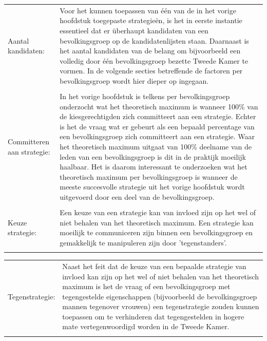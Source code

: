 \noindent\begin{tabularx}{\textwidth}{LI}
Aantal kandidaten: &  Voor het kunnen toepassen van één van de in het vorige hoofdstuk toegepaste strategie\"{e}n, is het in eerste instantie essentieel dat er \"{u}berhaupt kandidaten van een bevolkingsgroep op de kandidatenlijsten staan. Daarnaast is het aantal kandidaten van de belang om bijvoorbeeld een volledig door één bevolkingsgroep bezette Tweede Kamer te vormen. In de volgende secties betreffende de factoren per bevolkingsgroep wordt hier dieper op ingegaan. \\
\\  
Committeren aan strategie:  & In het vorige hoofdstuk is telkens per bevolkingsgroep onderzocht wat het theoretisch maximum is wanneer 100\% van de kiesgerechtigden zich committeert aan een strategie. Echter is het de vraag wat er gebeurt als een bepaald percentage van een bevolkingsgroep zich committeert aan een strategie. Waar het theoretisch maximum uitgaat van 100\% deelname van de leden van een bevolkingsgroep is dit in de praktijk moeilijk haalbaar. Het is daarom interessant te onderzoeken wat het theoretisch maximum per bevolkingsgroep is wanneer de meeste succesvolle strategie uit het vorige hoofdstuk wordt uitgevoerd door een deel van de bevolkingsgroep.  \\
\\
Keuze strategie: &  Een keuze van een strategie kan van invloed zijn op het wel of niet behalen van het theoretisch maximum. Een strategie kan moeilijk te communiceren zijn binnen een bevolkingsgroep en gemakkelijk te manipuleren zijn door 'tegenstanders'.\\
\\
\end{tabularx}  
 
\noindent\begin{tabularx}{\textwidth}{LI}

Tegenstrategie: & Naast het feit dat de keuze van een bepaalde strategie van invloed kan zijn op het wel of niet behalen van het theoretisch maximum is het de vraag of een bevolkingsgroep met tegengestelde eigenschappen (bijvoorbeeld de bevolkingsgroep mannen tegenover vrouwen) een tegenstrategie zouden kunnen toepassen om te verhinderen dat tegengestelden in hogere mate vertegenwoordigd worden in de Tweede Kamer. \\
\\
 \end{tabularx}  


